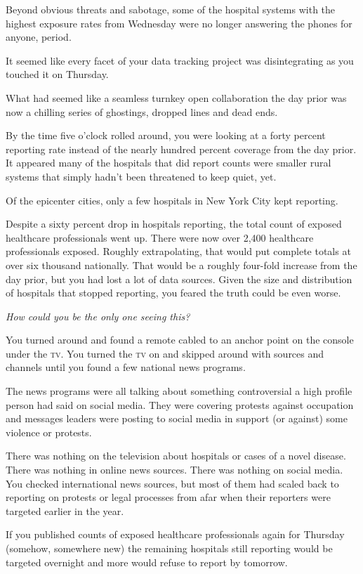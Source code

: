 \documentclass[a5paper, symmetric]{tufte-book}
\begin{document}
Beyond obvious threats and sabotage, some of the hospital systems with the highest exposure rates from Wednesday were no longer answering the phones for anyone, period. 

It seemed like every facet of your data tracking project was disintegrating as you touched it on Thursday. 

What had seemed like a seamless turnkey open collaboration the day prior was now a chilling series of ghostings, dropped lines and dead ends.

By the time five o'clock rolled around, you were looking at a forty percent reporting rate instead of the nearly hundred percent coverage from the day prior. It appeared many of the hospitals that did report counts were smaller rural systems that simply hadn't been threatened to keep quiet, yet. 

Of the epicenter cities, only a few hospitals in New York City kept reporting.

Despite a sixty percent drop in hospitals reporting, the total count of exposed healthcare professionals went up. There were now over 2,400 healthcare professionals exposed. Roughly extrapolating, that would put complete totals at over six thousand nationally. That would be a roughly four-fold increase from the day prior, but you had lost a lot of data sources. Given the size and distribution of hospitals that stopped reporting, you feared the truth could be even worse. 

\textit{How could you be the only one seeing this?}

You turned around and found a remote cabled to an anchor point on the console under the \textsc{tv}. You turned the \textsc{tv} on and skipped around with sources and channels until you found a few national news programs. 

The news programs were all talking about something controversial a high profile person had said on social media. They were covering protests against occupation and messages leaders were posting to social media in support (or against) some violence or protests. 

There was nothing on the television about hospitals or cases of a novel disease. There was nothing in online news sources. There was nothing on social media. You checked international news sources, but most of them had scaled back to reporting on protests or legal processes from afar when their reporters were targeted earlier in the year. 

If you published counts of exposed healthcare professionals again for Thursday (somehow, somewhere new) the remaining hospitals still reporting would be targeted overnight and more would refuse to report by tomorrow. 
\end{document}
